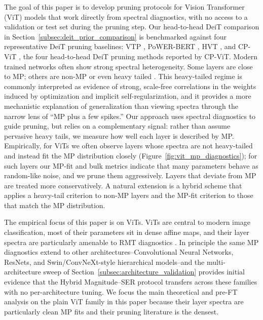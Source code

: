 \documentclass[11pt]{article}
\theoremstyle{plain}
\theoremstyle{definition}
\theoremstyle{remark}
\newcommand{\1}{\mathbf{1}}
\begin{document}
The goal of this paper is to develop pruning protocols for Vision Transformer (ViT) models that work directly from spectral diagnostics, with no access to a validation or test set during the pruning step.  Our head-to-head DeiT comparison in Section~\ref{subsec:deit_prior_comparison} is benchmarked against four representative DeiT pruning baselines: VTP \cite{zhu2021visual}, PoWER-BERT \cite{goyal2020powerbert}, HVT \cite{pan2021scalable}, and CP-ViT \cite{song2022cp}, the four head-to-head DeiT pruning methods reported by CP-ViT.  
Modern trained networks often show strong spectral heterogeneity.  Some layers are close to MP; others are non-MP or even heavy tailed \cite{martin2021implicit,mahoney2019traditional}.  This heavy-tailed regime is commonly interpreted as evidence of strong, scale-free correlations in the weights induced by optimization and implicit self-regularization, and it provides a more mechanistic explanation of generalization than viewing spectra through the narrow lens of ``MP plus a few spikes.''  Our approach uses spectral diagnostics to guide pruning, but relies on a complementary signal: rather than assume pervasive heavy tails, we measure how well each layer is described by MP.  Empirically, for ViTs we often observe layers whose spectra are not heavy-tailed and instead fit the MP distribution closely (Figure~\ref{fig:vit_mp_diagnostics}); for such layers our MP-fit and bulk metrics indicate that many parameters behave as random-like noise, and we prune them aggressively.  Layers that deviate from MP are treated more conservatively.  A natural extension is a hybrid scheme that applies a heavy-tail criterion to non-MP layers and the MP-fit criterion to those that match the MP distribution.

The empirical focus of this paper is on ViTs.  ViTs are central to modern image classification, most of their parameters sit in dense affine maps, and their layer spectra are particularly amenable to RMT diagnostics \cite{dosovitskiy2021image,vaswani2017attention}.  In principle the same MP diagnostics extend to other architectures--Convolutional Neural Networks, ResNets, and Swin/ConvNeXt-style hierarchical models--and the multi-architecture sweep of Section~\ref{subsec:architecture_validation} provides initial evidence that the Hybrid Magnitude--SER protocol transfers across these families with no per-architecture tuning.  We focus the main theoretical and pre-FT analysis on the plain ViT family in this paper because their layer spectra are particularly clean MP fits and their pruning literature is the densest.
\end{document}
